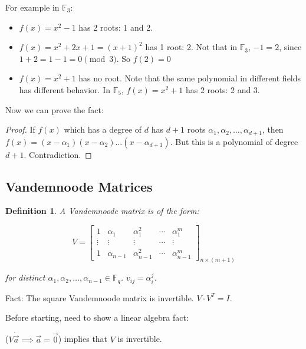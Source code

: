 \documentclass[letterpaper,12pt]{article}
\newtheorem{definition}{Definition}
\begin{document}
For example in $\mathbb{F}_3$:
\begin{itemize}
    \item $f(x)=x^2-1$ has 2 roots: 1 and 2.
    \item $f(x)=x^2+2x+1 = (x+1)^2$ has 1 root: 2. Not that in $\mathbb{F}_3$, $-1=2$, since $1+2=1-1=0\pmod 3$. So $f(2)=0$
    \item $f(x)=x^2+1$ has no root. Note that the same polynomial in different fields has different behavior. In $\mathbb{F}_5$, $f(x)=x^2+1$ has 2 roots: 2 and 3.
\end{itemize}
Now we can prove the fact:
\begin{proof}
    If $f(x)$ which has a degree of $d$ has $d+1$ roots $\alpha_1,\alpha_2,\ldots,\alpha_{d+1}$, then $f(x)=(x-\alpha_1)(x-\alpha_2)\ldots(x-\alpha_{d+1})$. But this is a polynomial of degree $d+1$. Contradiction.
\end{proof}
\subsection{Vandemnoode Matrices}
\begin{definition}
    A Vandemnoode matrix is of the form:

    \[V=\begin{bmatrix}
            1      & \alpha_1     & \alpha_1^2     & \cdots & \alpha_1^{m}     \\
            \vdots & \vdots       & \vdots         & \cdots & \vdots           \\
            1      & \alpha_{n-1} & \alpha_{n-1}^2 & \cdots & \alpha_{n-1}^{m}
        \end{bmatrix}_{n\times (m+1)}\]

    for distinct $\alpha_1,\alpha_2,\ldots,\alpha_{n-1}\in \mathbb{F}_q$.
    $v_{ij}=\alpha_i^{j}$.
\end{definition}
Fact: The square Vandemnoode matrix is invertible. $V\cdot V^T=I$.

Before starting, need to show a linear algebra fact:

($V\dot \vec{a}\implies \vec{a}=\vec{0}$) implies that $V$ is invertible.
\end{document}
